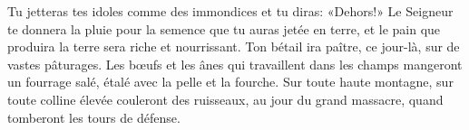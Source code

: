 Tu jetteras tes idoles comme des immondices et tu diras: «Dehors!»
Le Seigneur te donnera la pluie pour la semence que tu auras jetée en terre,
	et le pain que produira la terre sera riche et nourrissant.
Ton bétail ira paître, ce jour-là,
	sur de vastes pâturages.
Les bœufs et les ânes qui travaillent dans les champs
	mangeront un fourrage salé, étalé avec la pelle et la fourche.
Sur toute haute montagne, sur toute colline élevée
	couleront des ruisseaux, au jour du grand massacre,
	quand tomberont les tours de défense.
